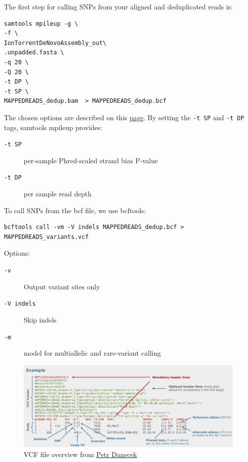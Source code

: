\documentclass[11pt]{article}
\begin{document}
The first step for calling SNPs from your aligned and deduplicated
reads is:

\begin{verbatim}
samtools mpileup -g \
-f \
IonTorrentDeNovoAssembly_out\
.unpadded.fasta \
-q 20 \
-Q 20 \
-t DP \
-t SP \
MAPPEDREADS_dedup.bam  > MAPPEDREADS_dedup.bcf
\end{verbatim}

The chosen options are described on this \href{http://samtools.sourceforge.net/samtools.shtml}{page}. By setting the \texttt{-t SP} and
\texttt{-t DP} tags, samtools mpileup provides:

\begin{description}
\item[{\texttt{-t SP}}] per-sample Phred-scaled strand bias P-value
\item[{\texttt{-t DP}}] per sample read depth
\end{description}


To call SNPs from the bcf file, we use bcftools:

\begin{verbatim}
bcftools call -vm -V indels MAPPEDREADS_dedup.bcf >  MAPPEDREADS_variants.vcf
\end{verbatim}


Options:
\begin{description}
\item[{\texttt{-v}}] Output variant sites only
\item[{\texttt{-V indels}}] Skip indels
\item[{\texttt{-m}}] model for multiallelic and rare-variant calling
\end{description}


\begin{figure}[htb]
\centering
\includegraphics[width=17cm]{DanecekVcfFile.png}
\caption{\label{fig:vcf}VCF file overview from \href{http://vcftools.sourceforge.net/VCF-poster.pdf}{Petr Danecek}}
\end{figure}
\end{document}
